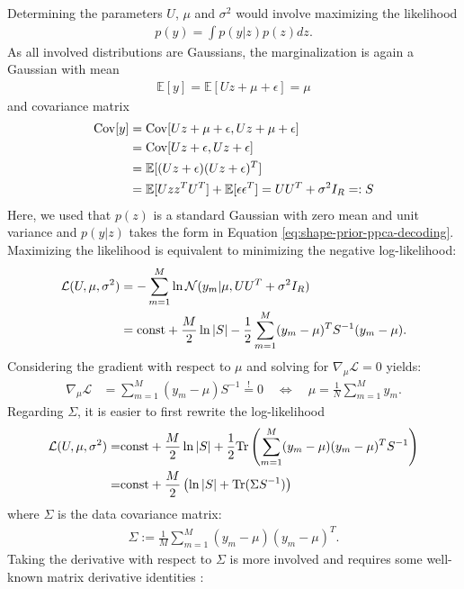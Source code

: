 Determining the parameters $U$, $\mu$ and $\sigma^2$ would involve
maximizing the likelihood
\begin{align}
  p(y) = \int p(y|z)p(z) dz.
\end{align}
As all involved distributions are Gaussians, the marginalization is again
a Gaussian \cite[Section~2.3]{Bishop:2006} with mean
\begin{align}
  \mathbb{E}[y] = \mathbb{E}[Uz + \mu + \epsilon] = \mu
  \label{eq:shape-prior-ppca-mean}
\end{align}
and covariance matrix
\begin{align}
  \mathrm{Cov}[y] &= \mathrm{Cov}[Uz + \mu + \epsilon, Uz + \mu + \epsilon]\\
  &= \mathrm{Cov}[Uz + \epsilon, Uz + \epsilon]\\
  &= \mathbb{E}[(Uz + \epsilon)(Uz + \epsilon)^T]\\
  &= \mathbb{E}[Uzz^TU^T] + \mathbb{E}[\epsilon \epsilon^T] = U U^T + \sigma^2I_R =: S
  \label{eq:shape-prior-ppca-covariance}
\end{align}
Here, we used that $p(z)$ is a standard Gaussian with zero mean and unit variance and $p(y | z)$
takes the form in Equation \eqref{eq:shape-prior-ppca-decoding}.
Maximizing the likelihood is equivalent to minimizing the negative log-likelihood:
\begin{align}
  \mathcal{L}(U, \mu, \sigma^2) &= - \sum_{m = 1} ^M \ln \mathcal{N}(y_m | \mu, UU^T + \sigma^2I_R)\\
  &= \mathrm{const} + \frac{M}{2} \ln |S| - \frac{1}{2} \sum_{m = 1}^M (y_m - \mu)^T S^{-1} (y_m - \mu).
\end{align}
Considering the gradient with respect to $\mu$ and solving for
$\nabla_\mu \mathcal{L} = 0$ yields:
\begin{align}
  \nabla_\mu \mathcal{L} &= \sum_{m = 1}^M (y_m - \mu) S^{-1} \overset{!}{=} 0
  \quad\Leftrightarrow\quad \mu = \frac{1}{N} \sum_{m = 1}^M y_m.
\end{align}
Regarding $\Sigma$, it is easier to first rewrite the log-likelihood
\begin{align}
  \mathcal{L}(U, \mu, \sigma^2) =& \mathrm{const} + \frac{M}{2} \ln |S| + \frac{1}{2}\mathrm{Tr}\left(\sum_{m = 1}^M (y_m - \mu)(y_m - \mu)^T S^{-1}\right)\\
  =& \mathrm{const} + \frac{M}{2} \left(\ln |S| + \mathrm{Tr}(\Sigma S^{-1})\right)
\end{align}
where $\Sigma$ is the data covariance matrix:
\begin{align}
  \Sigma := \frac{1}{M} \sum_{m = 1}^M (y_m - \mu)(y_m - \mu)^T.
\end{align}
Taking the derivative with respect to $\Sigma$ is more involved
and requires some well-known matrix derivative identities \cite[Section~8]{MagnusNeudecker:1999}:

